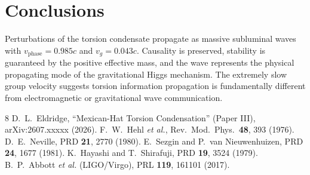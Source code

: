 \documentclass[twocolumn,prd,superscriptaddress,nofootinbib]{revtex4-2}
\begin{document}
\section{Conclusions}

Perturbations of the torsion condensate propagate as massive subluminal waves with $v_\text{phase} = 0.985c$ and $v_g = 0.043c$. Causality is preserved, stability is guaranteed by the positive effective mass, and the wave represents the physical propagating mode of the gravitational Higgs mechanism. The extremely slow group velocity suggests torsion information propagation is fundamentally different from electromagnetic or gravitational wave communication.

\begin{thebibliography}{8}
 D.~L.~Eldridge, ``Mexican-Hat Torsion Condensation'' (Paper III), arXiv:2607.xxxxx (2026).
 F.~W.~Hehl \textit{et al.}, Rev.\ Mod.\ Phys.\ \textbf{48}, 393 (1976).
 D.~E.~Neville, PRD \textbf{21}, 2770 (1980).
 E.~Sezgin and P.~van Nieuwenhuizen, PRD \textbf{24}, 1677 (1981).
 K.~Hayashi and T.~Shirafuji, PRD \textbf{19}, 3524 (1979).
 B.~P.~Abbott \textit{et al.} (LIGO/Virgo), PRL \textbf{119}, 161101 (2017).
\end{thebibliography}
\end{document}
